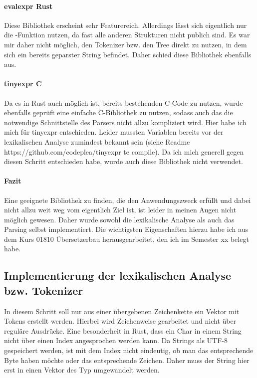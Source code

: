 \documentclass[11pt,a4paper, ngerman]{article}
\begin{document}
\paragraph{evalexpr Rust} Diese Bibliothek erscheint sehr Featurereich. Allerdings lässt sich eigentlich nur die -Funktion nutzen, da fast alle anderen Strukturen nicht publich sind. Es war mir daher nicht möglich, den Tokenizer bzw. den Tree direkt zu nutzen, in dem sich ein bereits geparster String befindet. Daher schied diese Bibliothek ebenfalls aus.

\paragraph{tinyexpr C} Da es in Rust auch möglich ist, bereits bestehenden C-Code zu nutzen, wurde ebenfalls geprüft eine einfache C-Bibliothek zu nutzen, sodass auch das die notwendige Schnittstelle des Parsers nicht allzu kompliziert wird. Hier habe ich mich für tinyexpr entschieden. Leider mussten Variablen bereits vor der lexikalischen Analyse zumindest bekannt sein (siehe Readme https://github.com/codeplea/tinyexpr te compile). Da ich mich generell gegen diesen Schritt entschieden habe, wurde auch diese Bibliothek nicht verwendet.

\paragraph{Fazit} Eine geeignete Bibliothek zu finden, die den Anwendungszweck erfüllt und dabei nicht allzu weit weg vom eigentlich Ziel ist, ist leider in meinen Augen nicht möglich gewesen. Daher wurde sowohl die lexikalische Analyse als auch das Parsing selbst implementiert. Die wichtigsten Eigenschaften hierzu habe ich aus dem Kurs 01810 Übersetzerbau herausgearbeitet, den ich im Semester xx belegt habe.

\subsection{Implementierung der lexikalischen Analyse bzw. Tokenizer} In diesem Schritt soll nur aus einer übergebenen Zeichenkette ein Vektor mit Tokens erstellt werden. Hierbei wird Zeichenweise gearbeitet und nicht über reguläre Ausdrücke. Eine besonderheit in Rust, dass ein Char in einem String nicht über einen Index angesprochen werden kann. Da Strings als UTF-8 gespeichert werden, ist mit dem Index nicht eindeutig, ob man das entsprechende Byte haben möchte oder das entsprechende Zeichen. Daher muss der String hier erst in einen Vektor des Typ  umgewandelt werden.
\end{document}

